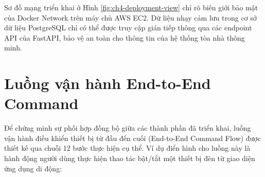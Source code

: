 Sơ đồ mạng triển khai ở Hình \ref{fig:ch4-deployment-view} chỉ rõ biên giới bảo mật của Docker Network trên máy chủ AWS EC2. Dữ liệu nhạy cảm lưu trong cơ sở dữ liệu PostgreSQL chỉ có thể được truy cập gián tiếp thông qua các endpoint API của FastAPI, bảo vệ an toàn cho thông tin của hệ thống tòa nhà thông minh.

\section{Luồng vận hành End-to-End Command}
\label{sec:ch4-e2e}

Để chứng minh sự phối hợp đồng bộ giữa các thành phần đã triển khai, luồng vận hành điều khiển thiết bị từ đầu đến cuối (End-to-End Command Flow) được thiết kế qua chuỗi 12 bước thực hiện cụ thể. Ví dụ điển hình cho luồng này là hành động người dùng thực hiện thao tác bật/tắt một thiết bị đèn từ giao diện ứng dụng di động:

